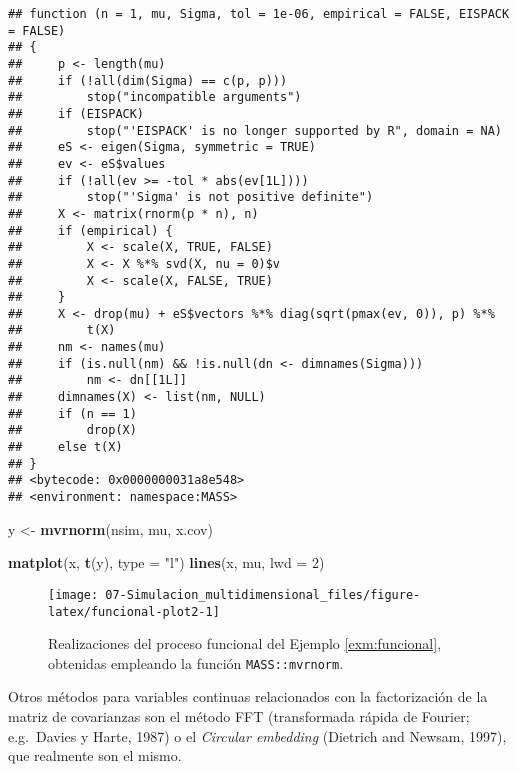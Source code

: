 \documentclass[
]{book}
\newenvironment{Shaded}{\begin{snugshade}}{\end{snugshade}}
\newcommand{\DataTypeTok}[1]{\textcolor[rgb]{0.13,0.29,0.53}{#1}}
\newcommand{\DecValTok}[1]{\textcolor[rgb]{0.00,0.00,0.81}{#1}}
\newcommand{\KeywordTok}[1]{\textcolor[rgb]{0.13,0.29,0.53}{\textbf{#1}}}
\newcommand{\NormalTok}[1]{#1}
\newcommand{\StringTok}[1]{\textcolor[rgb]{0.31,0.60,0.02}{#1}}
\theoremstyle{break}
\theoremstyle{definition}
\theoremstyle{definition}
\theoremstyle{definition}
\theoremstyle{remark}
\begin{document}
\begin{verbatim}
## function (n = 1, mu, Sigma, tol = 1e-06, empirical = FALSE, EISPACK = FALSE) 
## {
##     p <- length(mu)
##     if (!all(dim(Sigma) == c(p, p))) 
##         stop("incompatible arguments")
##     if (EISPACK) 
##         stop("'EISPACK' is no longer supported by R", domain = NA)
##     eS <- eigen(Sigma, symmetric = TRUE)
##     ev <- eS$values
##     if (!all(ev >= -tol * abs(ev[1L]))) 
##         stop("'Sigma' is not positive definite")
##     X <- matrix(rnorm(p * n), n)
##     if (empirical) {
##         X <- scale(X, TRUE, FALSE)
##         X <- X %*% svd(X, nu = 0)$v
##         X <- scale(X, FALSE, TRUE)
##     }
##     X <- drop(mu) + eS$vectors %*% diag(sqrt(pmax(ev, 0)), p) %*% 
##         t(X)
##     nm <- names(mu)
##     if (is.null(nm) && !is.null(dn <- dimnames(Sigma))) 
##         nm <- dn[[1L]]
##     dimnames(X) <- list(nm, NULL)
##     if (n == 1) 
##         drop(X)
##     else t(X)
## }
## <bytecode: 0x0000000031a8e548>
## <environment: namespace:MASS>
\end{verbatim}

\begin{Shaded}
\begin{Highlighting}[]
\NormalTok{y <-}\StringTok{ }\KeywordTok{mvrnorm}\NormalTok{(nsim, mu, x.cov)}

\KeywordTok{matplot}\NormalTok{(x, }\KeywordTok{t}\NormalTok{(y), }\DataTypeTok{type =} \StringTok{"l"}\NormalTok{)}
\KeywordTok{lines}\NormalTok{(x, mu, }\DataTypeTok{lwd =} \DecValTok{2}\NormalTok{)}
\end{Highlighting}
\end{Shaded}

\begin{figure}[!htb]

{\centering \texttt{[image: 07-Simulacion\_multidimensional\_files/figure-latex/funcional-plot2-1]} 

}

\caption{Realizaciones del proceso funcional del Ejemplo \ref{exm:funcional}, obtenidas empleando la función \texttt{MASS::mvrnorm}.}\label{fig:funcional-plot2}
\end{figure}

Otros métodos para variables continuas relacionados con la factorización de la matriz de covarianzas son el método FFT (transformada rápida de Fourier; e.g.~Davies y Harte, 1987) o el \emph{Circular embedding} (Dietrich and Newsam, 1997), que realmente son el mismo.
\end{document}
